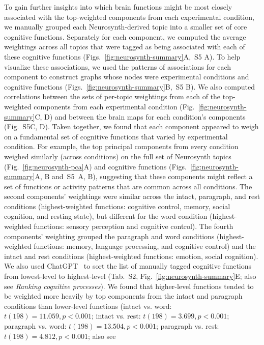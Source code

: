 \documentclass[english, 11pt]{article}
\newcommand{\neurosynthFull}{S5}
\newcommand{\topicTags}{S2}
\begin{document}
To gain further insights into which brain functions might be most closely
associated with the top-weighted components from each experimental condition,
we manually grouped each Neurosynth-derived topic into a smaller set of core
cognitive functions. Separately for each component, we computed the average
weightings across all topics that were tagged as being associated with each of
these cognitive functions (Figs.~\ref{fig:neurosynth-summary}A,~\neurosynthFull
A). To help visualize these associations, we used the patterns of associations
for each component to construct graphs whose nodes were experimental conditions
and cognitive functions (Figs.~\ref{fig:neurosynth-summary}B,~\neurosynthFull
B). We also computed correlations between the sets of per-topic weightings from
each of the top-weighted components from each experimental condition
(Fig.~\ref{fig:neurosynth-summary}C, D) and between the brain maps for each
condition's components (Fig.~\neurosynthFull C, D). Taken together, we found
that each component appeared to weigh on a fundamental set of cognitive
functions that varied by experimental condition. For example, the top principal
components from every condition weighed similarly (across conditions) on the
full set of Neurosynth topics (Fig.~\ref{fig:neurosynth-pca}A) and cognitive
functions (Figs.~\ref{fig:neurosynth-summary}A, B and~\neurosynthFull~A, B),
suggesting that these components might reflect a set of functions or activity
patterns that are common across all conditions. The second components'
weightings were similar across the intact, paragraph, and rest conditions
(highest-weighted functions: cognitive control, memory, social cognition, and
resting state), but different for the word condition (highest-weighted
functions: sensory perception and cognitive control). The fourth components'
weighting grouped the paragraph and word conditions (highest-weighted
functions: memory, language processing, and cognitive control) and the intact
and rest conditions (highest-weighted functions: emotion, social cognition). We
also used ChatGPT~\citep{ChatGPT} to sort the list of manually tagged cognitive
functions from lowest-level to highest-level (Tab.~\topicTags,
Fig.~\ref{fig:neurosynth-summary}E; also see \textit{Ranking cognitive
processes}). We found that higher-level functions tended to be weighted more
heavily by top components from the intact and paragraph conditions than
lower-level functions (intact vs. word: $t(198) = 11.059, p < 0.001$; intact
vs. rest: $t(198) = 3.699, p < 0.001$; paragraph vs. word: $t(198) = 13.504, p
< 0.001$; paragraph vs. rest: $t(198) = 4.812, p < 0.001$; also see
\end{document}
